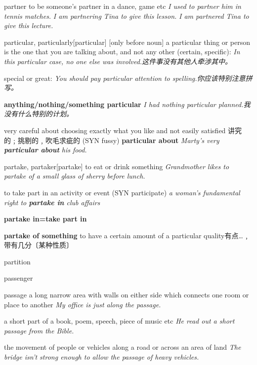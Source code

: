 \begin{word}{partner}
    to be someone’s partner in a dance, game etc
    \textit{I used to partner him in tennis matches.}
    \textit{I am partnering Tina to give this lesson.}
    \textit{I am partnered Tina to give this lecture.}
\end{word}

\begin{word}{particular, particularly}[particular]
    [only before noun] a particular thing or person is the one that you are talking about, and not any other (certain, specific):
    \textit{In this particular case, no one else was involved.这件事没有其他人牵涉其中。}

    special or great:
    \textit{You should pay particular attention to spelling.你应该特别注意拼写。}
    
    \textbf{anything/nothing/something particular}
    \textit{I had nothing particular planned.我没有什么特别的计划。}

    very careful about choosing exactly what you like and not easily satisfied 讲究的﹔挑剔的﹐吹毛求疵的 (SYN  fussy)
    \textbf{particular about}
    \textit{Marty’s very \textbf{particular about} his food.}

\end{word}

\begin{word}{partake, partaker}[partake]
    to eat or drink something
    \textit{Grandmother likes to partake of a small glass of sherry before lunch.}

    to take part in an activity or event
    (SYN  participate)
    \textit{a woman’s fundamental right to \textbf{partake in} club affairs}

    \textbf{partake in=take part in}

    \textbf{partake of something} 
    to have a certain amount of a particular quality有点…﹐带有几分〔某种性质〕
\end{word}

\begin{word}{partition}
\end{word}

\begin{word}{passenger}
\end{word}

\begin{word}{passage}
    a long narrow area with walls on either side which connects one room or place to another
    \textit{My office is just along the passage.}

    a short part of a book, poem, speech, piece of music etc
    \textit{He read out a short passage from the Bible.}

    the movement of people or vehicles along a road or across an area of land
    \textit{The bridge isn't strong enough to allow the passage of heavy vehicles.}
\end{word}

